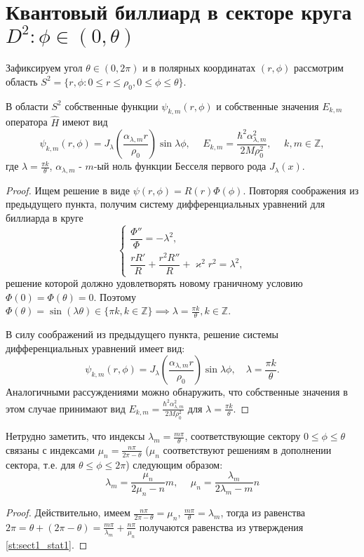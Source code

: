 \section{Квантовый биллиард в секторе круга $D^2: \phi \in (0, \theta)$}\label{sec:markup}
Зафиксируем угол $\theta \in (0, 2\pi)$ и в полярных координатах $(r, \phi)$ рассмотрим область 
$S^2 = \{r, \phi : 0 \leq r \leq \rho_0 , 0 \leq \phi \leq \theta\}$.
\begin{statement} \cite[p.~4]{wref13}
В области $S^2$ собственные функции $\psi_{k, m}(r, \phi)$ и собственные значения $E_{k, m}$ оператора $\hat{H}$ имеют вид 
$$\psi_{k, m}(r, \phi) = J_\lambda\left(\frac{\alpha_{\lambda, m}r}{\rho_0}\right)\sin{\lambda\phi}, \hspace{15pt} E_{k, m} = \frac{\hbar^2 \alpha_{\lambda, m}^2}{2M\rho_0^2}, \hspace{15pt} k, m \in \mathbb{Z},$$
где $\lambda = \frac{\pi k}{\theta}$, $\alpha_{\lambda, m}$ - $m$-ый ноль функции Бесселя первого рода $J_\lambda(x)$.
\label{st:sect1_stat1}
\end{statement}
\begin{proof}
Ищем решение в виде $\psi(r, \phi) = R(r)\Phi(\phi)$. Повторяя соображения из предыдущего пункта, получим систему дифференциальных уравнений для биллиарда в круге 
\[
\left\{\begin{array}{cc}
    \dfrac{\Phi''}{\Phi} =-\lambda^2, \\
    \dfrac{rR'}{R} + \dfrac{r^2R''}{R} + \varkappa^2r^2 = \lambda^2,
\end{array}
\right.
\]
решение которой должно удовлетворять новому граничному условию $\Phi(0)=\Phi(\theta)=0$. Поэтому $\Phi(\theta) = \sin(\lambda \theta) \in \{\pi k, k \in \mathbb{Z}\} \implies \lambda = \frac{\pi k}{\theta}, k \in \mathbb{Z}$.

В силу соображений из предыдущего пункта, решение системы дифференциальных уравнений имеет вид:
$$\psi_{k, m}(r, \phi) = J_\lambda\left(\frac{\alpha_{\lambda, m}r}{\rho_0}\right)\sin{\lambda\phi} , \quad \lambda=\frac{\pi k}{\theta}.$$
Аналогичными рассуждениями можно обнаружить, что собственные значения в этом случае принимают вид 
$E_{k, m} = \frac{\hbar^2 \alpha_{\lambda, m}^2}{2M\rho_0^2}$ для $\lambda=\frac{\pi k}{\theta}.$
\end{proof}

\begin{consequence} \cite[p.~4]{wref13}
Нетрудно заметить, что индексы $\lambda_m = \frac{m \pi}{\theta}$, соответствующие сектору $0 \leq \phi \leq \theta$ связаны с индексами $\mu_n = \frac{n \pi}{2\pi - \theta}$ ($\mu_n$ соответствуют решениям в дополнении сектора, т.е. для $\theta \leq \phi \leq 2\pi$) следующим образом:
$$\lambda_m = \frac{\mu_n}{2\mu_n - n}m, \hspace{15pt} \mu_n = \frac{\lambda_m}{2\lambda_m - m}n$$
\end{consequence}
\begin{proof}
Действительно, имеем 
$\frac{n \pi}{2\pi - \theta} = \mu_n$, $\frac{m \pi}{\theta} = \lambda_m$, тогда из равенства $2\pi = \theta + (2\pi - \theta) = \frac{m \pi}{\lambda_m} + \frac{n \pi}{\mu_n}$ получаются равенства из утверждения \ref{st:sect1_stat1}.
\end{proof}
\FloatBarrier
